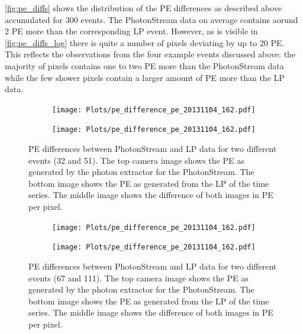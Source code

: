 \autoref{fig:pe_diffs} shows the distribution of the PE differences as
described above accumulated for 300 events. The PhotonStream data on average contains
aorund 2 PE more than the corresponding LP event. However, as is visible in
\autoref{fig:pe_diffs_log} there is quite a number of pixels deviating by up to
20 PE. This reflects the observations from the four example events discussed
above: the majority of pixels contains one to two PE more than the PhotonStream
data while the few shower pixels contain a larger amount of PE more than the LP
data.


%
\begin{figure}
  \begin{subfigure}{0.5\textwidth}
    \centering
    \texttt{[image: Plots/pe\_difference\_pe\_20131104\_162.pdf]}
  \end{subfigure}
  \begin{subfigure}{0.5\textwidth}
    \centering
    \texttt{[image: Plots/pe\_difference\_pe\_20131104\_162.pdf]}
  \end{subfigure}
  \caption{PE differences between PhotonStream and LP data for two different events (32 and 51). The top camera image
  shows the PE as generated by the photon extractor for the PhotonStream. The
  bottom image shows the PE as generated from the LP of the time series. The
  middle image shows the difference of both images in PE per pixel.}
  \label{fig:difference}
\end{figure}
%
%
\begin{figure}
  \begin{subfigure}{0.5\textwidth}
    \centering
    \texttt{[image: Plots/pe\_difference\_pe\_20131104\_162.pdf]}
  \end{subfigure}
  \begin{subfigure}{0.5\textwidth}
    \centering
    \texttt{[image: Plots/pe\_difference\_pe\_20131104\_162.pdf]}
  \end{subfigure}
  \caption{PE differences between PhotonStream and LP data for two different events (67 and 111). The top camera image
  shows the PE as generated by the photon extractor for the PhotonStream. The
  bottom image shows the PE as generated from the LP of the time series. The
  middle image shows the difference of both images in PE per pixel.}
  \label{fig:difference2}
\end{figure}


